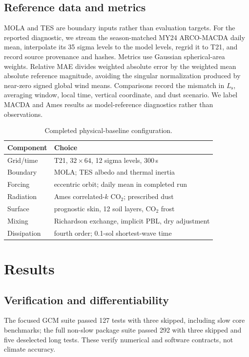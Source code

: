 \documentclass{article}
\newcommand{\Ls}{L_\mathrm{s}}
\begin{document}
\subsection{Reference data and metrics}
MOLA and TES are boundary inputs rather than evaluation targets. For the
reported diagnostic, we stream the season-matched MY24 ARCO-MACDA daily mean,
interpolate its 35 sigma levels to the model levels, regrid it to T21, and
record source provenance and hashes. Metrics use Gaussian spherical-area
weights. Relative MAE divides weighted absolute error by the weighted mean
absolute reference magnitude, avoiding the singular normalization produced by
near-zero signed global wind means. Comparisons record the mismatch in \(\Ls\),
averaging window, local time, vertical coordinate, and dust scenario. We label
MACDA and Ames results as model-reference diagnostics rather than observations.

\begin{table}[t]
\centering\small
\caption{Completed physical-baseline configuration.}\label{tab:config}
\begin{tabular}{ll}\toprule
Component & Choice\\\midrule
Grid/time & T21, \(32\times64\), 12 sigma levels, 300\,s\\
Boundary & MOLA; TES albedo and thermal inertia\\
Forcing & eccentric orbit; daily mean in completed run\\
Radiation & Ames correlated-\(k\) CO\(_2\); prescribed dust\\
Surface & prognostic skin, 12 soil layers, CO\(_2\) frost\\
Mixing & Richardson exchange, implicit PBL, dry adjustment\\
Dissipation & fourth order; 0.1-sol shortest-wave time\\\bottomrule
\end{tabular}
\end{table}

\section{Results}

\subsection{Verification and differentiability}
The focused GCM suite passed 127 tests with three skipped, including slow
core benchmarks; the full non-slow package suite passed 292 with three skipped
and five deselected long tests. These verify numerical and software contracts,
not climate accuracy.
\end{document}
